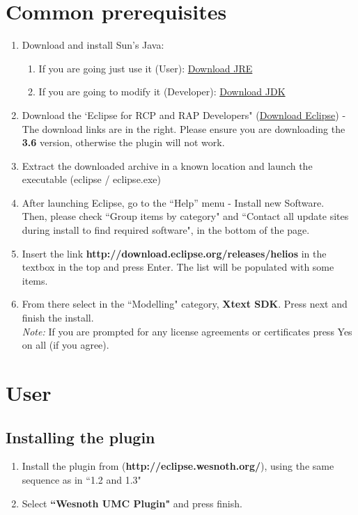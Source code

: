 \documentclass[10pt]{article}
\begin{document}
\section{Common prerequisites}
\begin{enumerate}
\item Download and install Sun's Java:
\begin{enumerate}
\item If you are going just use it (User): \href{https://cds.sun.com/is-bin/INTERSHOP.enfinity/WFS/CDS-CDS_Developer-Site/en_US/-/USD/ViewProductDetail-Start?ProductRef=jre-6u21-oth-JPR@CDS-CDS_Developer}{Download JRE}
\item If you are going to modify it (Developer): \href{http://java.sun.com/javase/downloads/widget/jdk6.jsp}{Download JDK}
\end{enumerate}
\item Download the  `Eclipse for RCP and RAP Developers" (\href{http://eclipse.org/downloads/packages/eclipse-rcp-and-rap-developers/heliosr}{Download Eclipse}) -
The download links are in the right. Please ensure you are downloading the \textbf{3.6} version,
otherwise the plugin will not work.
\item Extract the downloaded archive in a known location and launch the executable (eclipse / eclipse.exe)
\item After launching Eclipse, go to the ``Help'' menu - Install new Software. \\
  Then, please check ``Group items by category" and ``Contact all update sites during install to find required software",
  in the bottom of the page.
\item Insert the link \textbf{http://download.eclipse.org/releases/helios} in the textbox in the top and press Enter.
  The list will be populated with some items.
\item From there select in the ``Modelling" category, \textbf{Xtext SDK}.
  Press next and finish the install.\\
  \textit{Note:} If you are prompted for any license agreements or certificates press Yes on all (if you agree).
\end{enumerate}

\section{User}
\subsection{Installing the plugin}
\begin{enumerate}
\item Install the plugin from (\textbf{http://eclipse.wesnoth.org/}), using the same sequence as in ``1.2 and 1.3"
\item Select \textbf{``Wesnoth UMC Plugin"} and press finish.
\end{enumerate}
\end{document}
